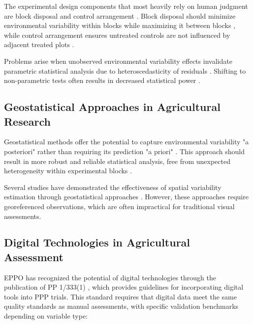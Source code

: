 \documentclass[12pt,a4paper,oneside]{report}
\begin{document}
The experimental design components that most heavily rely on human judgment are block disposal and control arrangement \cite{tocherDesignAnalysisBlock1952,williamsOptimalityContrastsBlock2015}. Block disposal should minimize environmental variability within blocks while maximizing it between blocks \cite{vanesSpatialNatureRandomization1993,brienMultiphaseExperimentsLeast2011}, while control arrangement ensures untreated controls are not influenced by adjacent treated plots \cite{piephoWhyRandomizeAgricultural2013}.

Problems arise when unobserved environmental variability effects invalidate parametric statistical analysis due to heteroscedasticity of residuals \cite{schabenbergerStatisticalMethodsSpatial2004,onofriNewMethodAnalysis2010}. Shifting to non-parametric tests often results in decreased statistical power \cite{stroupRethinkingAnalysisNonNormal2015,agrestiIntroductionCategoricalData2018}.

\subsection{Geostatistical Approaches in Agricultural Research}

Geostatistical methods offer the potential to capture environmental variability "a posteriori" rather than requiring its prediction "a priori" \cite{oliverGeostatisticalApplicationsPrecision2010,websterGeostatisticsEnvironmentalScientists2007}. This approach should result in more robust and reliable statistical analysis, free from unexpected heterogeneity within experimental blocks \cite{richterGeostatisticalModelsAgricultural2012,lopezEfficiencyIncompleteBlock1995}.

Several studies have demonstrated the effectiveness of spatial variability estimation through geostatistical approaches \cite{bullockDataIntensiveFarmManagement2019,castrignanoGeostatisticalApproachModelling2017,jinEfficientGeostatisticalAnalysis2021,puntelLeveragingDigitalAgriculture2024,trevisanSpatialVariabilityCrop2021}. However, these approaches require georeferenced observations, which are often impractical for traditional visual assessments.

\subsection{Digital Technologies in Agricultural Assessment}

EPPO has recognized the potential of digital technologies through the publication of PP 1/333(1) \cite{PP1333}, which provides guidelines for incorporating digital tools into PPP trials. This standard requires that digital data meet the same quality standards as manual assessments, with specific validation benchmarks depending on variable type:
\end{document}
